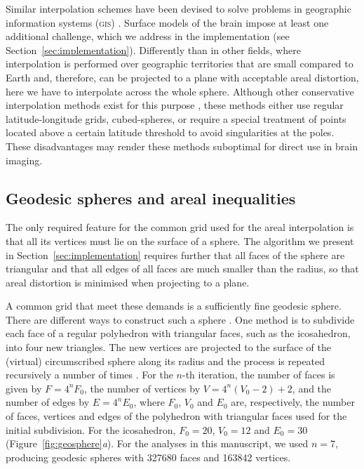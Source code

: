 Similar interpolation schemes have been devised to solve problems in geographic information systems (\textsc{gis}) \citep{Markoff1973, Goodchild1980, Flowerdew1991, Gregory2010}. Surface models of the brain impose at least one additional challenge, which we address in the implementation (see Section~\ref{sec:implementation}). Differently than in other fields, where interpolation is performed over geographic territories that are small compared to Earth and, therefore, can be projected to a plane with acceptable areal distortion, here we have to interpolate across the whole sphere. Although other conservative interpolation methods exist for this purpose \citep{Jones1999, Lauritzen2008, Ullrich2009}, these methods either use regular latitude-longitude grids, cubed-spheres, or require a special treatment of points located above a certain latitude threshold to avoid singularities at the poles. These disadvantages may render these methods suboptimal for direct use in brain imaging.

\subsection{Geodesic spheres and areal inequalities}
\label{sec:geosphere}

The only required feature for the common grid used for the areal interpolation is that all its vertices must lie on the surface of a sphere. The algorithm we present in Section~\ref{sec:implementation} requires further that all faces of the sphere are triangular and that all edges of all faces are much smaller than the radius, so that areal distortion is minimised when projecting to a plane.

A common grid that meet these demands is a sufficiently fine geodesic sphere. There are different ways to construct such a sphere \citep{Kenner1976}. One method is to subdivide each face of a regular polyhedron with triangular faces, such as the icosahedron, into four new triangles. The new vertices are projected to the surface of the (virtual) circumscribed sphere along its radius and the process is repeated recursively a number of times \citep{Lauchner1969}. For the $n$-th iteration, the number of faces is given by $F=4^nF_0$, the number of vertices by $V=4^n(V_0-2)+2$, and the number of edges by $E=4^nE_0$, where $F_0$, $V_0$ and $E_0$ are, respectively, the number of faces, vertices and edges of the polyhedron with triangular faces used for the initial subdivision. For the icosahedron, $F_0=20$, $V_0=12$ and $E_0=30$ (Figure~\ref{fig:geosphere}\emph{a}). For the analyses in this manuscript, we used $n=7$, producing geodesic spheres with 327680 faces and 163842 vertices.

